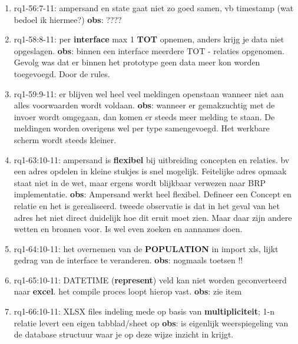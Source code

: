 \begin{enumerate}
    \item rq1-56:7-11: ampersand en state gaat niet zo goed samen, vb timestamp (wat bedoel ik hiermee?)
    \newline\textbf{obs}: ????
    
    \item rq1-58:8-11: per \textbf{interface} max 1 \textbf{TOT} opnemen, anders krijg je data niet opgeslagen.
    \newline\textbf{obs}: binnen een interface meerdere TOT - relaties opgenomen. 
    Gevolg was dat er binnen het prototype geen data meer kon worden toegevoegd. 
    Door de rules.
    
    \item rq1-59:9-11: er blijven wel heel veel meldingen openstaan wanneer niet aan alles voorwaarden wordt voldaan.
    \newline\textbf{obs}: wanneer er gemakzuchtig met de invoer wordt omgegaan, dan komen er steeds meer melding te staan.
    De meldingen worden overigens wel per type samengevoegd.
    Het werkbare scherm wordt steeds kleiner.
    
    \item rq1-63:10-11: ampersand is \textbf{flexibel} bij uitbreiding concepten en relaties. bv een adres opdelen in kleine stukjes is snel mogelijk. Feitelijke adres opmaak staat niet in de wet, maar ergens wordt blijkbaar verwezen naar BRP implementatie.
    \newline\textbf{obs}: Ampersand werkt heel flexibel. Defineer een Concept en relatie en het is gerealiseerd. 
    tweede observatie is dat in het geval van het adres het niet direct duidelijk hoe dit eruit moet zien. 
    Maar daar zijn andere wetten en bronnen voor.
    Is wel even zoeken en aannames doen.
    
    \item rq1-64:10-11: het overnemen van de \textbf{POPULATION} in import xls, lijkt gedrag van de interface te veranderen. 
    \newline\textbf{obs}: nogmaals toetsen !!
    
    \item rq1-65:10-11: DATETIME (\textbf{represent}) veld kan niet worden geconverteerd naar \textbf{excel}. het compile proces loopt hierop vast.
    \newline\textbf{obs}: zie item
    
    \item rq1-66:10-11: XLSX files indeling mede op basis van \textbf{multipliciteit}; 1-n relatie levert een eigen tabblad/sheet op 
    \newline\textbf{obs}: is eigenlijk weerspiegeling van de database structuur waar je op deze wijze inzicht in krijgt.
    

\end{enumerate}
